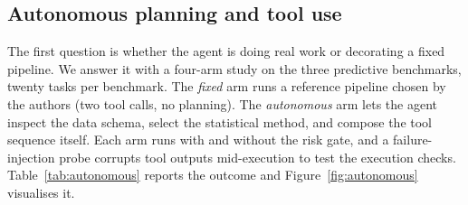 \documentclass[preprint,12pt,authoryear]{elsarticle}
\begin{document}
\subsection{Autonomous planning and tool use}
\label{sec:results_autonomous}


The first question is whether the agent is doing real work or decorating a fixed pipeline.
We answer it with a four-arm study on the three predictive benchmarks, twenty tasks per benchmark.
The \emph{fixed} arm runs a reference pipeline chosen by the authors (two tool calls, no planning).
The \emph{autonomous} arm lets the agent inspect the data schema, select the statistical method, and compose the tool sequence itself.
Each arm runs with and without the risk gate, and a failure-injection probe corrupts tool outputs mid-execution to test the execution checks.
Table~\ref{tab:autonomous} reports the outcome and Figure~\ref{fig:autonomous} visualises it.
\end{document}
